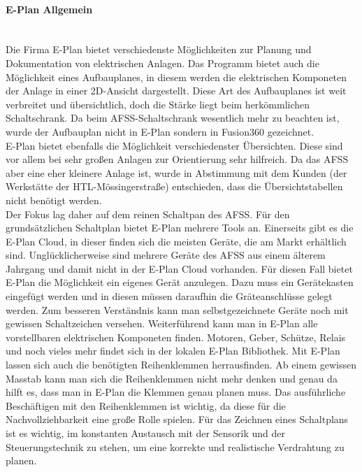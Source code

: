     \paragraph{E-Plan Allgemein}\mbox{}\\
    Die Firma E-Plan bietet verschiedenste Möglichkeiten zur Planung und Dokumentation von elektrischen Anlagen. Das Programm bietet auch die Möglichkeit eines Aufbauplanes, in diesem werden die elektrischen Komponeten der Anlage in einer 2D-Ansicht dargestellt. Diese Art des Aufbauplanes ist weit verbreitet und übersichtlich, doch die Stärke liegt beim herkömmlichen Schaltschrank. Da beim AFSS-Schaltschrank wesentlich mehr zu beachten ist, wurde der Aufbauplan nicht in E-Plan sondern in Fusion360 gezeichnet.\\
    E-Plan bietet ebenfalls die Möglichkeit verschiedenster Übersichten. Diese sind vor allem bei sehr großen Anlagen zur Orientierung sehr hilfreich. Da das AFSS aber eine eher kleinere Anlage ist, wurde in Abstimmung mit dem Kunden (der Werkstätte der HTL-Mössingerstraße) entschieden, dass die Übersichtstabellen nicht benötigt werden.\\
    Der Fokus lag daher auf dem reinen Schaltpan des AFSS. Für den grundsätzlichen Schaltplan bietet E-Plan mehrere Tools an. Einerseits gibt es die E-Plan Cloud, in dieser finden sich die meisten Geräte, die am Markt erhältlich sind. Unglücklicherweise sind mehrere Geräte des AFSS aus einem älterem Jahrgang und damit nicht in der E-Plan Cloud vorhanden. Für diesen Fall bietet E-Plan die Möglichkeit ein eigenes Gerät anzulegen. Dazu muss ein Gerätekasten eingefügt werden und in diesen müssen daraufhin die Gräteanschlüsse gelegt werden. Zum besseren Verständnis kann man selbstgezeichnete Geräte noch mit gewissen Schaltzeichen versehen. Weiterführend kann man in E-Plan alle vorstellbaren elektrischen Komponeten finden. Motoren, Geber, Schütze, Relais und noch vieles mehr findet sich in der lokalen E-Plan Bibliothek. Mit E-Plan lassen sich auch die benötigten Reihenklemmen herrausfinden. Ab einem gewissen Masstab kann man sich die Reihenklemmen nicht mehr denken und genau da hilft es, dass man in E-Plan die Klemmen genau planen muss. Das ausführliche Beschäftigen mit den Reihenklemmen ist wichtig, da diese für die Nachvollziehbarkeit eine große Rolle spielen. Für das Zeichnen eines Schaltplans ist es wichtig, im konstanten Austausch mit der Sensorik und der Steuerungstechnik zu stehen, um eine korrekte und realistische Verdrahtung zu planen.\\
